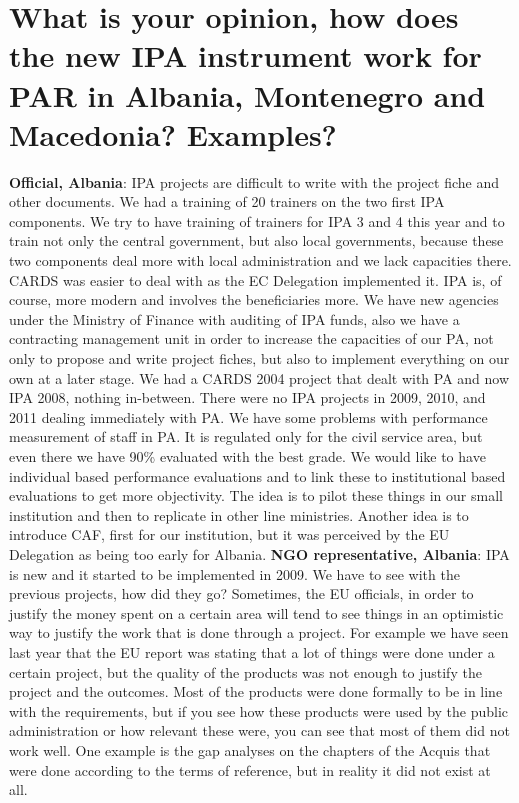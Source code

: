 \section{ What is your opinion, how does the new IPA instrument work for PAR in Albania, Montenegro and Macedonia? Examples?}
\textbf{Official, Albania}: IPA projects are difficult to write with the project fiche and other documents. We had a training of 20 trainers on the two first IPA components. We try to have training of trainers for IPA 3 and 4 this year and to train not only the central government, but also local governments, because these two components deal more with local administration and we lack capacities there. CARDS was easier to deal with as the EC Delegation implemented it. IPA is, of course, more modern and involves the beneficiaries more. We have new agencies under the Ministry of Finance with auditing of IPA funds, also we have a contracting management unit in order to increase the capacities of our PA, not only to propose and write project fiches, but also to implement everything on our own at a later stage. We had a CARDS 2004 project that dealt with PA and now IPA 2008, nothing in-between. There were no IPA projects in 2009, 2010, and 2011 dealing immediately with PA. We have some problems with performance measurement of staff in PA. It is regulated only for the civil service area, but even there we have 90\% evaluated with the best grade. We would like to have individual based performance evaluations and to link these to institutional based evaluations to get more objectivity. The idea is to pilot these things in our small institution and then to replicate in other line ministries. Another idea is to introduce CAF, first for our institution, but it was perceived by the EU Delegation as being too early for Albania.
\textbf{NGO representative, Albania}: IPA is new and it started to be implemented in 2009. We have to see with the previous projects, how did they go? Sometimes, the EU officials, in order to justify the money spent on a certain area will tend to see things in an optimistic way to justify the work that is done through a project. For example we have seen last year that the EU report was stating that a lot of things were done under a certain project, but the quality of the products was not enough to justify the project and the outcomes. Most of the products were done formally to be in line with the requirements, but if you see how these products were used by the public administration or how relevant these were, you can see that most of them did not work well. One example is the gap analyses on the chapters of the Acquis that were done according to the terms of reference, but in reality it did not exist at all.
